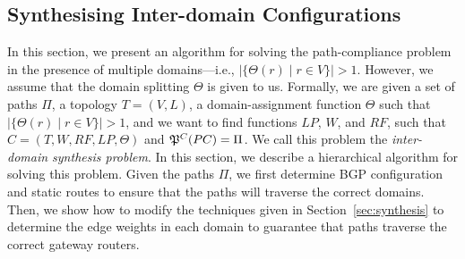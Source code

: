 \subsection{Synthesising Inter-domain Configurations}
\label{sec:synth-multi}

In this section, we present an algorithm for 
solving the path-compliance problem in the presence
of multiple domains---i.e., $|\{\Theta(r) \mid r\in V\}|>1$.
However, we assume that the domain splitting $\Theta$ is given to us.
Formally, we are given a set of paths $\Pi$,
a topology $T=(V,L)$,
a domain-assignment function $\Theta$ such that $|\{\Theta(r) \mid r\in V\}|>1$, 
and we want to find functions
$LP$, $W$, and $RF$,  such that
$C=(T,W,RF,LP,\Theta)$ and
$\mathfrak{P}^C(PC) = \Pi$.
We call this problem the \emph{inter-domain synthesis problem}.
In this section, we describe a hierarchical algorithm for solving this problem.
Given the paths $\Pi$, we first determine 
BGP configuration and static routes to ensure that the paths will traverse the correct
domains.
Then, we show how to modify the techniques given in Section~\ref{sec:synthesis}
to determine the edge weights in each domain to guarantee that paths traverse
the correct gateway routers.

\begin{figure}
	\centering
	\hfill
	\hfill
\end{figure}

